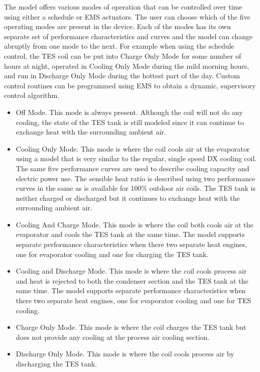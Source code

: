 The model offers various modes of operation that can be controlled over time using either a schedule or EMS actuators. The user can choose which of the five operating modes are present in the device. Each of the modes has its own separate set of performance characteristics and curves and the model can change abruptly from one mode to the next. For example when using the schedule control, the TES coil can be put into Charge Only Mode for some number of hours at night, operated in Cooling Only Mode during the mild morning hours, and run in Discharge Only Mode during the hottest part of the day. Custom control routines can be programmed using EMS to obtain a dynamic, supervisory control algorithm.

\begin{itemize}
\item
  Off Mode. This mode is always present. Although the coil will not do any cooling, the state of the TES tank is still modeled since it can continue to exchange heat with the surrounding ambient air.
\item
  Cooling Only Mode. This mode is where the coil cools air at the evaporator using a model that is very similar to the regular, single speed DX cooling coil. The same five performance curves are used to describe cooling capacity and electric power use. The sensible heat ratio is described using two performance curves in the same as is available for 100\% outdoor air coils. The TES tank is neither charged or discharged but it continues to exchange heat with the surrounding ambient air.
\item
  Cooling And Charge Mode. This mode is where the coil both cools air at the evaporator and cools the TES tank at the same time. The model supports separate performance characteristics when there two separate heat engines, one for evaporator cooling and one for charging the TES tank.
\item
  Cooling and Discharge Mode. This mode is where the coil cools process air and heat is rejected to both the condenser section and the TES tank at the same time. The model supports separate performance characteristics when there two separate heat engines, one for evaporator cooling and one for TES cooling.
\item
  Charge Only Mode. This mode is where the coil charges the TES tank but does not provide any cooling at the process air cooling section.
\item
  Discharge Only Mode. This mode is where the coil cools process air by discharging the TES tank.
\end{itemize}

